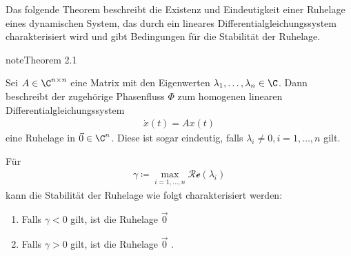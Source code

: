 \documentclass[letterpaper,10pt,english]{jupyterBook}
\begin{document}
\sphinxAtStartPar
Das folgende Theorem beschreibt die Existenz und Eindeutigkeit einer Ruhelage eines dynamischen System, das durch ein lineares Differentialgleichungssystem charakterisiert wird und gibt Bedingungen für die Stabilität der Ruhelage.
\label{ode_stability/ruhelagen:theorem:stabilität_linear}
\begin{sphinxadmonition}{note}{Theorem 2.1}



\sphinxAtStartPar
Sei \(A\in \C^{n\times n}\) eine Matrix mit den Eigenwerten \(\lambda_1,\dots, \lambda_n\in \C\).
Dann beschreibt der zugehörige Phasenfluss \(\Phi\) zum homogenen linearen Differentialgleichungssystem
\begin{equation*}
\begin{split}\dot{x}(t) = Ax(t)\end{split}
\end{equation*}
\sphinxAtStartPar
eine Ruhelage in \(\vec{0} \in \C^n\).
Diese ist sogar eindeutig, falls \(\lambda_i\neq 0, i=1,\ldots,n\) gilt.

\sphinxAtStartPar
Für
\begin{equation*}
\begin{split}\gamma \coloneqq \max_{i=1,\dots,n} \mathcal{Re}(\lambda_i)\end{split}
\end{equation*}
\sphinxAtStartPar
kann die Stabilität der Ruhelage wie folgt charakterisiert werden:
\begin{enumerate}
%
\item {} 
\sphinxAtStartPar
Falls \(\gamma <0\) gilt, ist die Ruhelage \(\vec{0}\) 

\item {} 
\sphinxAtStartPar
Falls \(\gamma >0\) gilt, ist die Ruhelage \(\vec{0}\) .

\end{enumerate}
\end{sphinxadmonition}
\end{document}
